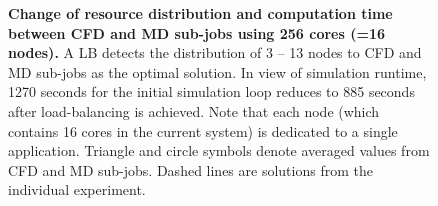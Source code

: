 \documentclass[preprint,12pt]{elsarticle}
\begin{document}
\begin{figure}
\centering
{}
\hskip 1cm
\vskip-0.2cm
\caption[]{\small {\bf Change of resource distribution and computation time
between CFD and MD sub-jobs using 256 cores (=16 nodes).}
A LB detects the distribution of 3 -- 13 nodes to CFD and MD sub-jobs as
the optimal solution. In view of simulation runtime, 1270 seconds for the
initial simulation loop reduces to 885 seconds after load-balancing is achieved.
Note that each node (which contains 16 cores in the current system) is
dedicated to a single application. Triangle and circle symbols denote
averaged values from CFD and MD sub-jobs. Dashed lines are solutions
from the individual experiment.
}
\label{Fig:LBSmall}
\end{figure}
\end{document}
